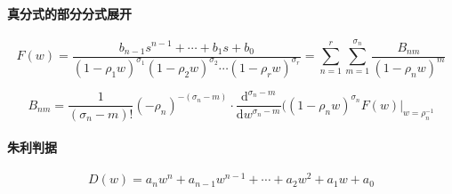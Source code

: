 \documentclass[b5paper,10pt,UTF8]{ctexart}
\begin{document}
\paragraph{真分式的部分分式展开}

\begin{displaymath}
F(w) = \frac{b_{n - 1}s^{n - 1}+\cdots+b_1s+b_0}{(1 - \rho_1w)^{\sigma_1}(1 - \rho_2w)^{\sigma_2}\cdots(1 - \rho_rw)^{\sigma_r}} = \sum_{n = 1}^{r}\sum_{m = 1}^{\sigma_n}\frac{B_{nm}}{(1 - \rho_nw)^m}
\end{displaymath}

\begin{displaymath}
  B_{nm} = \frac{1}{(\sigma_n - m)!}(-\rho_n)^{-(\sigma_n - m)}\cdot\frac{\mathrm{d}^{\sigma_n - m}}{\mathrm{d}w^{\sigma_n - m}}((1 - \rho_nw)^{\sigma_n}F(w)|_{w = \rho_n^{-1}}
\end{displaymath}

\paragraph{朱利判据}

\begin{displaymath}
  D(w) = a_nw^n + a_{n - 1}w^{n - 1} + \cdots + a_2w^2 + a_1w + a_0
\end{displaymath}
\end{document}
